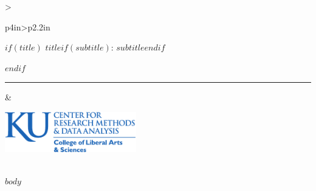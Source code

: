\documentclass[$if(fontsize)$$fontsize$$endif$,english]{scrartcl}
\providecommand{\tabularnewline}{\\}
\begin{document}
\noindent \begin{center}
\begin{tabular}[t]{>{\raggedright}p{4in}>{\centering}p{2.2in}}
\hline 
\medskip{}

$if(title)$
\textsc{\huge{}$title$$if(subtitle)$: $subtitle$$endif$}{\huge \par}
$endif$

\noindent \rule[0.5ex]{1\linewidth}{1pt}

\medskip{}
  & \medskip{}


\includegraphics[width=2.25in]{CRMDA_logo}\tabularnewline

\tabularnewline
\hline 
\end{tabular}
\par\end{center}

$body$
\end{document}
